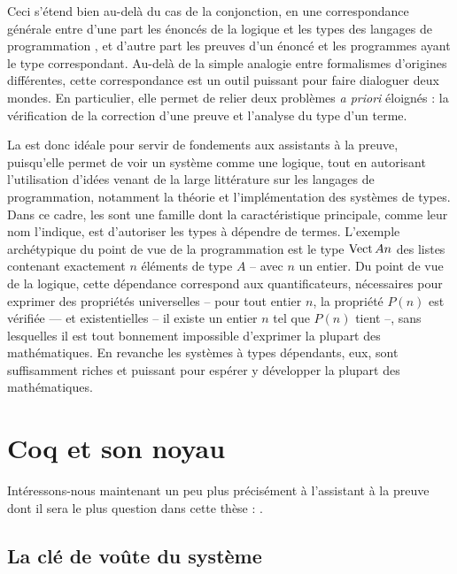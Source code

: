 Ceci s’étend bien au-delà du cas de la conjonction,
en une correspondance générale entre d’une part les énoncés de la logique et les types des langages de programmation , et d’autre part les preuves d’un énoncé et les programmes ayant le type correspondant.
Au-delà de la simple analogie entre formalismes d’origines différentes, cette correspondance est un outil puissant pour faire dialoguer deux mondes.
En particulier, elle permet de relier deux problèmes \textit{a priori} éloignés :
la vérification de la correction d’une preuve et l’analyse du type d’un terme.

La  est donc idéale pour servir de fondements aux
assistants à la preuve, puisqu’elle permet de voir un système
comme une logique, tout en autorisant l’utilisation d’idées venant de
la large littérature sur les langages de programmation, notamment
la théorie et l’implémentation des systèmes de types.
Dans ce cadre, les  sont une famille dont
la caractéristique principale, comme leur nom l’indique, est d’autoriser les
types à dépendre de termes. L’exemple archétypique du point de vue de la 
programmation est le type
$\operatorname{Vect} A n$ des listes contenant exactement $n$ éléments
de type $A$ – avec $n$ un entier.
Du point de vue de la logique, cette
dépendance correspond aux quantificateurs, nécessaires pour exprimer des
propriétés universelles – pour tout entier $n$, la propriété $P(n)$ est
vérifiée — et existentielles – il existe un entier $n$ tel que $P(n)$ tient –,
sans lesquelles il est tout bonnement impossible d’exprimer la plupart des
mathématiques. En revanche les systèmes à types dépendants, eux, sont suffisamment
riches et puissant pour espérer y développer la plupart des mathématiques.

\section{Coq et son noyau}
\label{sec:intro-coq}

Intéressons-nous maintenant un peu plus précisément à l’assistant à la
preuve dont il sera le plus question dans cette thèse : .

\subsection{La clé de voûte du système}


